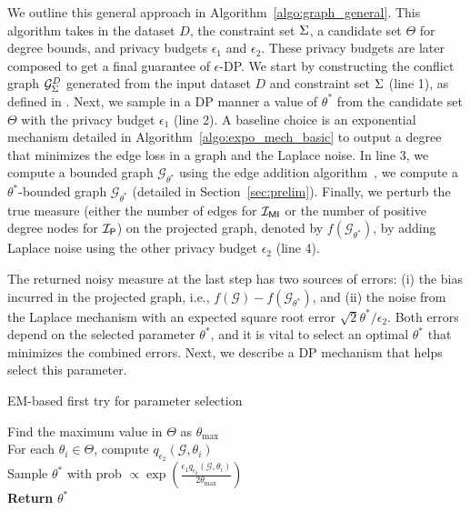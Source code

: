 We outline this general approach in Algorithm~\ref{algo:graph_general}. This algorithm takes in the dataset $D$, the constraint set ${\Sigma}$, a candidate set $\Theta$ for degree bounds, and privacy budgets $\epsilon_1$ and $\epsilon_2$. These privacy budgets are later composed to get a final guarantee of $\epsilon$-DP.
We start by constructing the conflict graph ${\mathcal{G}_{{\Sigma}}^{D}}$ generated from the input dataset $D$ and constraint set ${\Sigma}$ (line 1), as defined in . 
Next, we sample in a DP manner a value of $\theta^*$ from the candidate set $\Theta$ with the privacy budget $\epsilon_1$ (line 2). A baseline choice is an exponential mechanism detailed in Algorithm~\ref{algo:expo_mech_basic} to output a degree that minimizes the edge loss in a graph and the Laplace noise.
In line 3, we compute a bounded graph $\mathcal{G}_{\theta^*}$ using the edge addition algorithm~\cite{day2016publishing}, we compute a $\theta^*$-bounded graph $\mathcal{G}_{\theta^*}$ (detailed in Section~\ref{sec:prelim}). Finally, we perturb the true measure (either the number of edges for $\mathcal{I_{\mathsf{MI}}}$ or the number of positive degree nodes for $\mathcal{I_\mathsf{P}}$) on the projected graph, denoted by $f(\mathcal{G}_{\theta^*})$, by adding Laplace noise using the other privacy budget $\epsilon_2$ (line 4). 

The returned noisy measure at the last step has two sources of errors: (i) the bias incurred in the projected graph, i.e.,  $f(\mathcal{G})-f(\mathcal{G}_{\theta^*})$, and (ii) the noise from the Laplace mechanism with an expected square root error ${\sqrt{2}\theta^*}/{\epsilon_2}$. Both errors depend on the selected parameter $\theta^*$, and it is vital to select an optimal $\theta^*$ that minimizes the combined errors. Next, we describe a DP mechanism that helps select this parameter. 


\begin{algorithm}[b]
\caption{EM-based first try for parameter selection}
\label{algo:expo_mech_basic}
    Find the maximum value in $\Theta$ as $\theta_{\max}$ \\
    For each $\theta_i \in \Theta$, compute $q_{\epsilon_2}(\mathcal{G}, \theta_i)$ 
    \\
    Sample $\theta^*$ with prob $\propto \exp( \frac{\epsilon_1 q_{\epsilon_2}(\mathcal{G}, \theta_i)}{2\theta_{\max}})$ \\
    {\bf Return} $\theta^*$
\end{algorithm}


